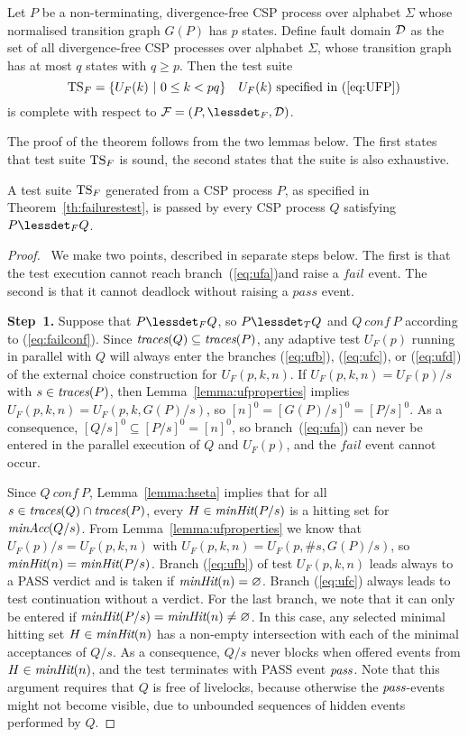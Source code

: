 \begin{theorem}\label{th:failurestest}
Let $P$ be a non-terminating, divergence-free CSP process over alphabet $\Sigma$ whose
normalised transition graph $G(P)$ has $p$ states. Define fault domain ${\cal
D}$ as the set of all divergence-free CSP processes over alphabet $\Sigma$,
whose transition graph has at most $q$ states with $q \ge p$. Then the test
suite
\[
{\text{TS}}_F = \{ U_F(k)~|~0 \le k < pq  \}\quad\text{$U_F(k)$ specified in (\ref{eq:UFP})}
\]
is complete with respect to ${\cal F} = (P,\lessdet_F,{\cal D})$.
\end{theorem}
%
The proof of the theorem follows from the two lemmas below. The first states
that test suite ${\text{TS}}_F$ is sound, the second states that the suite is also
exhaustive.
%
\begin{lemma}\label{lemma:mainfsound}
A test suite ${\text{TS}}_F$ generated from a CSP process $P$, as specified in
Theorem~\ref{th:failurestest}, is passed by every CSP process $Q$ satisfying
$P\lessdet_F Q$.
\end{lemma}
\begin{proof}{~}We make two points, described in separate steps below. The
first is that the test execution cannot reach branch~(\ref{eq:ufa})and raise
a $fail$ event.  The second is that it cannot deadlock without raising a
$pass$ event.

{\bf Step~1.} Suppose that $P\lessdet_F Q$, so $P\lessdet_T Q$ and  $Q\ conf\
P$ according to (\ref{eq:failconf}). Since   $\text{\it traces}(Q)\subseteq \text{\it traces}(P)$, any
adaptive test $U_F(p)$ running in parallel with $Q$ will always enter the
branches (\ref{eq:ufb}), (\ref{eq:ufc}), or (\ref{eq:ufd}) of the external
choice construction for $U_F(p,k,n)$. If $U_F(p,k,n) = U_F(p)/s$ with
$s\in\text{\it traces}(P)$, then Lemma~\ref{lemma:ufproperties} implies $U_F(p,k,n) =
U_F(p,k,G(P)/s)$, so $[n]^0 = [G(P)/s]^0 = [P/s]^0$. As a consequence,
$[Q/s]^0\subseteq [P/s]^0 = [n]^0$, so branch~(\ref{eq:ufa}) can never be
entered in the parallel execution of $Q$ and $U_F(p)$, and the $fail$ event
cannot occur.

\medskip
{} Since $Q\ conf\ P$, Lemma~\ref{lemma:hseta} implies
that for all $s\in\text{\it traces}(Q)\cap\text{\it traces}(P)$, every $H \in \text{\it minHit}(P/s)$ is a
hitting set for $\text{\it minAcc}(Q/s)$. From Lemma~\ref{lemma:ufproperties} we know
that $U_F(p)/s = U_F(p,k,n)$ with $U_F(p,k,n) = U_F(p,\#s,G(P)/s)$, so
$\text{\it minHit}(n) = \text{\it minHit}(P/s)$. Branch (\ref{eq:ufb}) of test $U_F(p,k,n)$
leads always to a PASS verdict and is taken if $\text{\it minHit}(n) = \varnothing$.
Branch (\ref{eq:ufc}) always leads to test continuation without a verdict.
For the last branch, we note that it can only be entered if $\text{\it minHit}(P/s) =
\text{\it minHit}(n) \neq\varnothing$. In this case, any selected minimal hitting set
$H\in\text{\it minHit}(n)$ has a non-empty intersection with each of the minimal
acceptances of $Q/s$. As a consequence, $Q/s$ never blocks when offered
events from $H\in\text{\it minHit}(n)$, and the test terminates with PASS event
${\text{\it pass}}$. Note that this argument requires that $Q$ is free of livelocks,
because otherwise the ${\text{\it pass}}$-events might not become visible, due to
unbounded sequences of hidden events performed by $Q$. \xbox
\end{proof}
